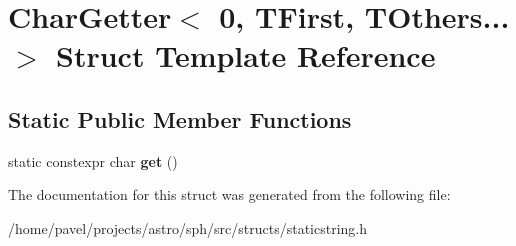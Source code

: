 \hypertarget{structCharGetter_3_010_00_01TFirst_00_01TOthers_8_8_8_01_4}{}\section{Char\+Getter$<$ 0, T\+First, T\+Others... $>$ Struct Template Reference}
\label{structCharGetter_3_010_00_01TFirst_00_01TOthers_8_8_8_01_4}
\subsection*{Static Public Member Functions}
\begin{DoxyCompactItemize}
\item 
\hypertarget{structCharGetter_3_010_00_01TFirst_00_01TOthers_8_8_8_01_4_a49fa7a72bcaec3429ecca0efbd46db9f}{}\label{structCharGetter_3_010_00_01TFirst_00_01TOthers_8_8_8_01_4_a49fa7a72bcaec3429ecca0efbd46db9f} 
static constexpr char {\bfseries get} ()
\end{DoxyCompactItemize}


The documentation for this struct was generated from the following file\+:\begin{DoxyCompactItemize}
\item 
/home/pavel/projects/astro/sph/src/structs/staticstring.\+h\end{DoxyCompactItemize}
